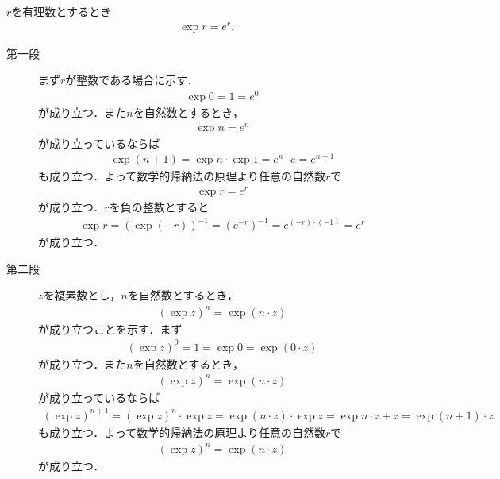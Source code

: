 	\begin{screen}
		\begin{thm}
			$r$を有理数とするとき
			\begin{align}
				\exp{r} = e^{r}.
			\end{align}
		\end{thm}
	\end{screen}
	
	\begin{sketch}\mbox{}
		\begin{description}
			\item[第一段]
				まず$r$が整数である場合に示す．
				\begin{align}
					\exp{0} = 1 = e^0
				\end{align}
				が成り立つ．また$n$を自然数とするとき，
				\begin{align}
					\exp{n} = e^n
				\end{align}
				が成り立っているならば
				\begin{align}
					\exp{(n+1)} = \exp{n} \cdot \exp{1} = e^n \cdot e = e^{n+1}
				\end{align}
				も成り立つ．よって数学的帰納法の原理より任意の自然数$r$で
				\begin{align}
					\exp{r} = e^{r}
				\end{align}
				が成り立つ．$r$を負の整数とすると
				\begin{align}
					\exp{r} = (\exp{(-r)})^{-1} = (e^{-r})^{-1} = e^{(-r) \cdot (-1)} = e^{r}
				\end{align}
				が成り立つ．
			
			\item[第二段]
				$z$を複素数とし，$n$を自然数とするとき，
				\begin{align}
					(\exp{z})^{n} = \exp{(n \cdot z)}
				\end{align}
				が成り立つことを示す．まず
				\begin{align}
					(\exp{z})^{0} = 1 = \exp{0} = \exp{(0 \cdot z)}
				\end{align}
				が成り立つ．また$n$を自然数とするとき，
				\begin{align}
					(\exp{z})^{n} = \exp{(n \cdot z)}
				\end{align}
				が成り立っているならば
				\begin{align}
					(\exp{z})^{n+1} = (\exp{z})^{n} \cdot \exp{z} = \exp{(n \cdot z)} \cdot \exp{z}
					= \exp{n \cdot z + z}
					= \exp{(n+1) \cdot z}
				\end{align}
				も成り立つ．よって数学的帰納法の原理より任意の自然数$r$で
				\begin{align}
					(\exp{z})^{n} = \exp{(n \cdot z)}
				\end{align}
				が成り立つ．
				

\end{description}
\end{sketch}
